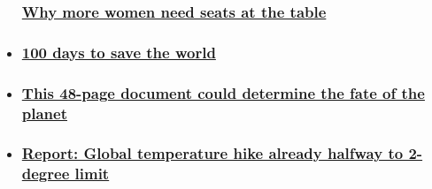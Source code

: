 \begin{itemize}
{  \subsubsection{\texorpdfstring{\href{/2015/11/23/opinions/cop21-women-need-participate/index.html}{Why
  more women need seats at the
  table}}{Why more women need seats at the table}}\label{why-more-women-need-seats-at-the-table}}
\item
  \hypertarget{100-days-to-save-the-world}{%
  \subsubsection{\texorpdfstring{\href{/2015/08/21/opinions/sutter-climate-paris-two-degrees-100-days/index.html}{100
  days to save the
  world}}{100 days to save the world}}\label{100-days-to-save-the-world}}
\item
  \hypertarget{this-48-page-document-could-determine-the-fate-of-the-planet}{%
  \subsubsection{\texorpdfstring{\href{/2015/12/06/opinions/sutter-cop21-draft-text-two-degrees/index.html}{This
  48-page document could determine the fate of the
  planet}}{This 48-page document could determine the fate of the planet}}\label{this-48-page-document-could-determine-the-fate-of-the-planet}}
\item
  \hypertarget{report-global-temperature-hike-already-halfway-to-2-degree-limit}{%
  \subsubsection{\texorpdfstring{\href{/2015/11/19/us/october-temperatures-two-degrees/index.html}{Report:
  Global temperature hike already halfway to 2-degree
  limit}}{Report: Global temperature hike already halfway to 2-degree limit}}\label{report-global-temperature-hike-already-halfway-to-2-degree-limit}}
\end{itemize}


